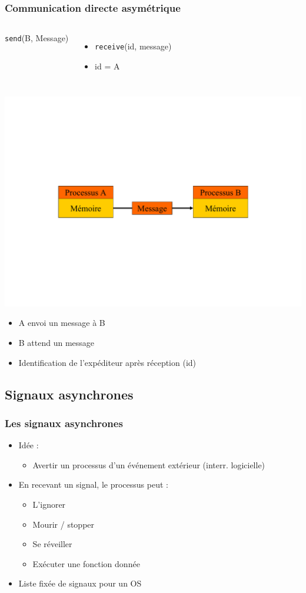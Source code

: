 \begin{frame}
\frametitle{Communication directe asymétrique}
\begin{columns}
\texttt{send}(B, Message)
\begin{itemize}
\item \texttt{receive}(id, message)
\item id = A
\end{itemize}
\end{columns}
\includegraphics[width=.9\textwidth]{../illustration/message_comm_directe.pdf}
\begin{itemize}
\item A envoi un message à B
\item B attend un message
\item Identification de l’expéditeur après réception (id)
\end{itemize}
\end{frame}

\subsection{Signaux asynchrones}
\begin{frame}
\frametitle{Les signaux asynchrones}
\begin{itemize}
\item Idée :
\begin{itemize}
\item Avertir un processus d’un événement extérieur (interr. logicielle)
\end{itemize}
\item En recevant un signal, le processus peut :
\begin{itemize}
\item L’ignorer
\item Mourir / stopper
\item Se réveiller
\item Exécuter une fonction donnée
\end{itemize}
\item Liste fixée de signaux pour un OS
\end{itemize}
\end{frame}

